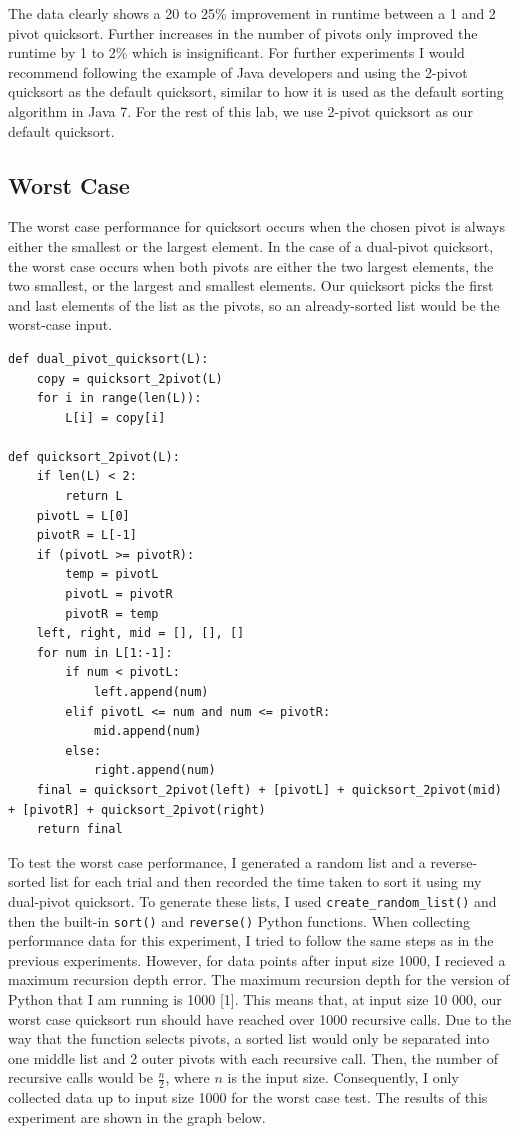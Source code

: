 \documentclass[12pt]{article}
\begin{document}
The data clearly shows a 20 to 25\% improvement in runtime between a 1 and 2 pivot quicksort. Further increases in the number of pivots only improved the runtime by 1 to 2\% which is insignificant. For further experiments I would recommend following the example of Java developers and using the 2-pivot quicksort as the default quicksort, similar to how it is used as the default sorting algorithm in Java 7. For the rest of this lab, we use 2-pivot quicksort as our default quicksort.

\subsection{Worst Case}
The worst case performance for quicksort occurs when the chosen pivot is always either the smallest or the largest element. In the case of a dual-pivot quicksort, the worst case occurs when both pivots are either the two largest elements, the two smallest, or the largest and smallest elements. Our quicksort picks the first and last elements of the list as the pivots, so an already-sorted list would be the worst-case input. 

\footnotesize
\begin{verbatim}
def dual_pivot_quicksort(L):
    copy = quicksort_2pivot(L)
    for i in range(len(L)):
        L[i] = copy[i]

def quicksort_2pivot(L):
    if len(L) < 2:
        return L
    pivotL = L[0]
    pivotR = L[-1]
    if (pivotL >= pivotR):
        temp = pivotL
        pivotL = pivotR
        pivotR = temp
    left, right, mid = [], [], []
    for num in L[1:-1]:
        if num < pivotL:
            left.append(num)
        elif pivotL <= num and num <= pivotR:
            mid.append(num)
        else:
            right.append(num)
    final = quicksort_2pivot(left) + [pivotL] + quicksort_2pivot(mid) + [pivotR] + quicksort_2pivot(right)
    return final
\end{verbatim}
\normalsize

To test the worst case performance, I generated a random list and a reverse-sorted list for each trial and then recorded the time taken to sort it using my dual-pivot quicksort. To generate these lists, I used \verb+create_random_list()+ and then the built-in \verb+sort()+ and \verb+reverse()+ Python functions. When collecting performance data for this experiment, I tried to follow the same steps as in the previous experiments. However, for data points after input size 1000, I recieved a maximum recursion depth error. The maximum recursion depth for the version of Python that I am running is 1000 [1]. This means that, at input size 10 000, our worst case quicksort run should have reached over 1000 recursive calls. Due to the way that the function selects pivots, a sorted list would only be separated into one middle list and 2 outer pivots with each recursive call. Then, the number of recursive calls would be $\frac{n}{2}$, where $n$ is the input size. 
Consequently, I only collected data up to input size 1000 for the worst case test. The results of this experiment are shown in the graph below. 
\end{document}
